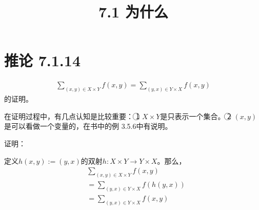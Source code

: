 \documentclass{article}
\theoremstyle{mystyle}
\begin{document}
\title{7.1 为什么}
\maketitle

\section*{推论 7.1.14}

\begin{align*}
  \sum \limits_{(x,y) \in X \times Y} f(x, y) = \sum \limits_{(y,x) \in Y \times X} f(x, y)
\end{align*}
的证明。

\noindent 在证明过程中，有几点认知是比较重要：
\newline
\textcircled{1} $X \times Y$是只表示一个集合。
\newline
\textcircled{2} $(x, y)$是可以看做一个变量的，在书中的例 3.5.6中有说明。

\noindent 证明：

定义$h(x,y):=(y,x)$的双射$h: X \times Y \rightarrow Y \times X$。那么，
\begin{align*}
   & \sum \limits_{(x,y) \in X \times Y} f(x, y)      \\
   & = \sum \limits_{(y,x) \in Y \times X} f(h(y, x)) \\
   & = \sum \limits_{(y,x) \in Y \times X} f(x, y)    \\
\end{align*}
\end{document}
